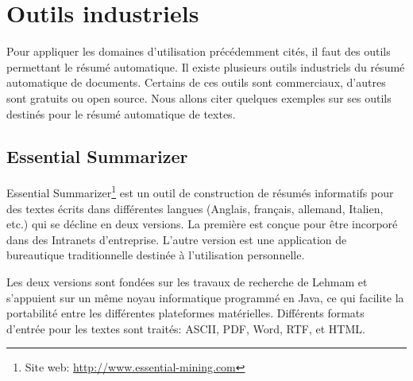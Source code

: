 \documentclass[a4paper,12pt,oneside]{../use/ESIthesis}
\begin{document}
\section{Outils industriels}

Pour appliquer les domaines d'utilisation précédemment cités, il faut des outils permettant le résumé automatique. 
Il existe plusieurs outils industriels du résumé automatique de documents. 
Certains de ces outils sont commerciaux, d'autres sont gratuits ou open source. 
Nous allons citer quelques exemples sur ses outils destinés pour le résumé automatique de textes.

\subsection{Essential Summarizer} %

Essential Summarizer\footnote{Site web: \url{http://www.essential-mining.com}} est un outil de construction de résumés informatifs pour des textes écrits dans différentes langues (Anglais, français, allemand, Italien, etc.) qui se décline en deux versions. 
La première est conçue pour être incorporé dans des Intranets d'entreprise. 
L'autre version est une application de bureautique traditionnelle destinée à l'utilisation personnelle.

Les deux versions sont fondées sur les travaux de recherche de Lehmam \cite{10-lehmam} et s'appuient sur un même noyau informatique programmé en Java, ce qui facilite la portabilité entre les différentes plateformes matérielles. 
Différents formats d'entrée pour les textes sont traités: ASCII, PDF, Word, RTF, et HTML. 
\end{document}
